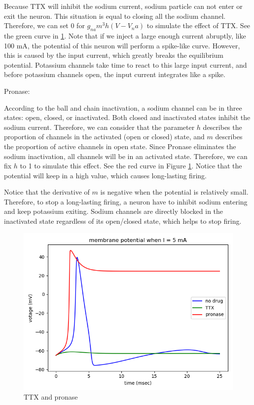 \documentclass[11pt]{article}
\begin{document}
\begin{enumerate}
		Because TTX will inhibit the sodium current, sodium particle can not enter or exit the neuron. This situation is equal to closing all the sodium channel. Therefore, we can set 0 for $g_{na}m^3h(V-V_na)$ to simulate the effect of TTX. See the green curve in \ref{fig:fig5}. Note that if we inject a large enough current abruptly, like 100 mA, the potential of this neuron will perform a spike-like curve. However, this is caused by the input current, which greatly breaks the equilibrium potential. Potassium channels take time to react to this large input current, and before potassium channels open, the input current integrates like a spike.
		
		Pronase:
		
		According to the ball and chain inactivation, a sodium channel can be in three states: open, closed, or inactivated. Both closed and inactivated states inhibit the sodium current. Therefore, we can consider that the parameter $h$ describes the proportion of channels in the activated (open or closed) state, and $m$ describes the proportion of active channels in open state. Since Pronase eliminates the sodium inactivation, all channels will be in an activated state. Therefore, we can fix $h$ to 1 to simulate this effect. See the red curve in Figure \ref{fig:fig5}. Notice that the potential will keep in a high value, which causes long-lasting firing.
		
		Notice that the derivative of $m$ is negative when the potential is relatively small. Therefore, to stop a long-lasting firing, a neuron have to inhibit sodium entering and keep potassium exiting. Sodium channels are directly blocked in the inactivated state regardless of its open/closed state, which helps to stop firing.
		
		\begin{figure}[ht]
			\centering
			\includegraphics[scale=0.3]{plot_programming_7.png}
			\caption{TTX and pronase}
			\label{fig:fig5}
		\end{figure}
	\end{enumerate}
	
	
    
\end{document}
